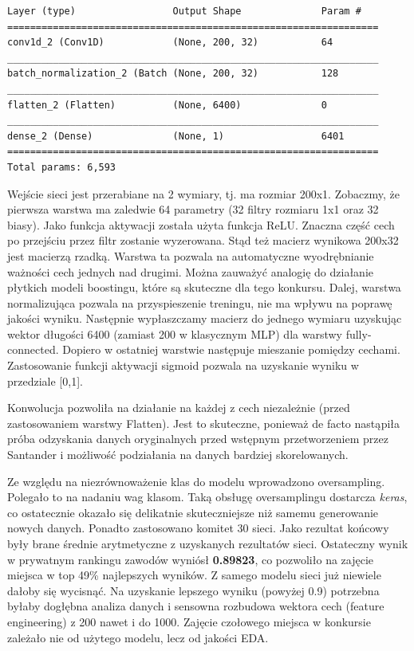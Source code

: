 \documentclass[12pt]{article}
\begin{document}
\newpage

\begin{lstlisting}[caption={Model sieci CNN}, captionpos=b]
Layer (type)                 Output Shape              Param #   
=================================================================
conv1d_2 (Conv1D)            (None, 200, 32)           64        
_________________________________________________________________
batch_normalization_2 (Batch (None, 200, 32)           128       
_________________________________________________________________
flatten_2 (Flatten)          (None, 6400)              0         
_________________________________________________________________
dense_2 (Dense)              (None, 1)                 6401      
=================================================================
Total params: 6,593
\end{lstlisting} 

Wejście sieci jest przerabiane na 2 wymiary, tj. ma rozmiar 200x1. 
Zobaczmy, że pierwsza warstwa ma zaledwie 64 parametry (32 filtry rozmiaru 1x1 oraz 32 biasy). Jako funkcja aktywacji została użyta funkcja ReLU. Znaczna część cech po przejściu przez filtr zostanie wyzerowana. Stąd też macierz wynikowa 200x32 jest macierzą rzadką. Warstwa ta pozwala na automatyczne wyodrębnianie ważności cech jednych nad drugimi. Można zauważyć analogię do działanie płytkich modeli boostingu, które są skuteczne dla tego konkursu. Dalej, warstwa normalizująca pozwala na przyspieszenie treningu, nie ma wpływu na poprawę jakości wyniku. Następnie wypłaszczamy macierz do jednego wymiaru uzyskując wektor długości 6400 (zamiast 200 w klasycznym MLP) dla warstwy fully-connected. Dopiero w ostatniej warstwie następuje mieszanie pomiędzy cechami. Zastosowanie funkcji aktywacji sigmoid pozwala na uzyskanie wyniku w przedziale [0,1].

Konwolucja pozwoliła na działanie na każdej z cech niezależnie (przed zastosowaniem warstwy Flatten). Jest to skuteczne, ponieważ de facto nastąpiła próba odzyskania danych oryginalnych przed wstępnym przetworzeniem przez Santander i możliwość podziałania na danych bardziej skorelowanych. 

Ze względu na niezrównoważenie klas do modelu wprowadzono oversampling. Polegało to na nadaniu wag klasom. Taką obsługę oversamplingu dostarcza \textit{keras}, co ostatecznie okazało się delikatnie skuteczniejsze niż samemu generowanie nowych danych. Ponadto zastosowano komitet 30 sieci. Jako rezultat końcowy były brane średnie arytmetyczne z uzyskanych rezultatów sieci. Ostateczny wynik w prywatnym rankingu zawodów wyniósł \textbf{0.89823}, co pozwoliło na zajęcie miejsca w top 49\% najlepszych wyników. Z samego modelu sieci już niewiele dałoby się wycisnąć. Na uzyskanie lepszego wyniku (powyżej 0.9) potrzebna byłaby dogłębna analiza danych i sensowna rozbudowa wektora cech (feature engineering) z 200 nawet i do 1000. Zajęcie czołowego miejsca w konkursie zależało nie od użytego modelu, lecz od jakości EDA.
\end{document}
